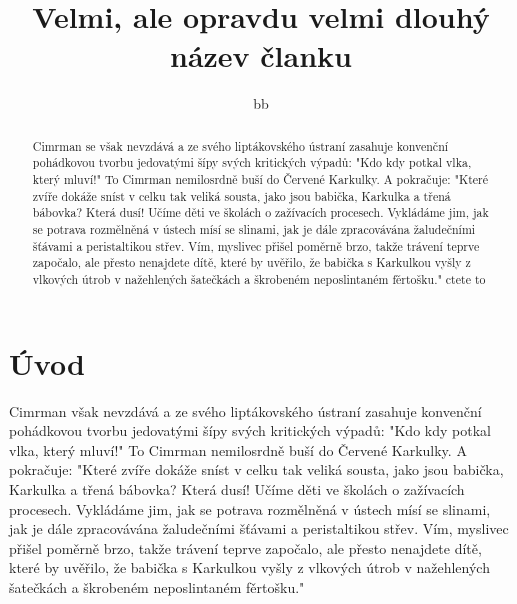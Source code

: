 \documentclass[11pt]{article}
\begin{document}
\title{Velmi, ale opravdu velmi dlouhý název članku}



\author{bb}
\maketitle
\begin{abstract}
	
	Cimrman se však nevzdává a ze svého liptákovského ústraní zasahuje konvenční pohádkovou tvorbu jedovatými šípy svých kritických výpadů: "Kdo kdy potkal vlka, který mluví!" To Cimrman nemilosrdně buší do Červené Karkulky. A pokračuje: "Které zvíře dokáže sníst v celku tak veliká sousta, jako jsou babička, Karkulka a třená bábovka? Která dusí! Učíme děti ve školách o zažívacích procesech. Vykládáme jim, jak se potrava rozmělněná v ústech mísí se slinami, jak je dále zpracovávána žaludečními šťávami a peristaltikou střev. Vím, myslivec přišel poměrně brzo, takže trávení teprve započalo, ale přesto nenajdete dítě, které by uvěřilo, že babička s Karkulkou vyšly z vlkových útrob v nažehlených šatečkách a škrobeném neposlintaném fěrtošku."
	ctete to
\end{abstract}

\section{Úvod}
Cimrman %
však \cite{einstein} nevzdává a ze svého liptákovského ústraní zasahuje konvenční pohádkovou tvorbu jedovatými šípy svých kritických výpadů: "Kdo kdy potkal vlka, který mluví!" To Cimrman nemilosrdně buší do Červené Karkulky. A pokračuje: "Které zvíře dokáže sníst v celku tak veliká sousta, jako jsou babička, Karkulka a třená bábovka? Která dusí! Učíme děti ve školách o zažívacích procesech. Vykládáme jim, jak se potrava rozmělněná v ústech mísí se slinami, jak je dále zpracovávána žaludečními šťávami a peristaltikou střev. Vím, myslivec přišel poměrně brzo, takže trávení teprve započalo, ale přesto nenajdete dítě, které by uvěřilo, že babička s Karkulkou vyšly z vlkových útrob v nažehlených šatečkách a škrobeném neposlintaném fěrtošku."
\end{document}
